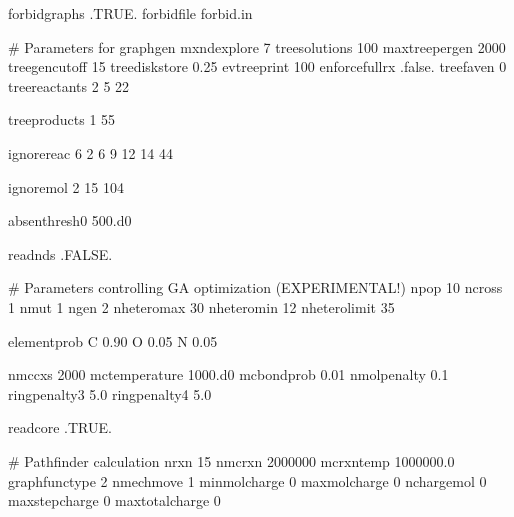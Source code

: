 \begin{DoxyVerb}
 forbidgraphs .TRUE.
 forbidfile forbid.in

 # Parameters for graphgen
 mxndexplore 7
 treesolutions 100
 maxtreepergen 2000
 treegencutoff 15
 treediskstore 0.25
 evtreeprint 100
 enforcefullrx .false.
 treefaven 0
 treereactants 2
 5 22

 treeproducts 1
 55

 ignorereac 6
 2 6 9 12 14 44

 ignoremol 2
 15 104

 absenthresh0 500.d0

 readnds .FALSE.

 # Parameters controlling GA optimization (EXPERIMENTAL!)
 npop 10
 ncross 1
 nmut 1
 ngen 2
 nheteromax 30
 nheteromin 12
 nheterolimit 35

 elementprob{
 C 0.90
 O 0.05
 N 0.05
 }

 nmccxs  2000
 mctemperature 1000.d0
 mcbondprob 0.01
 nmolpenalty 0.1
 ringpenalty3 5.0
 ringpenalty4 5.0

 readcore .TRUE.

 # Pathfinder calculation
 nrxn 15
 nmcrxn 2000000
 mcrxntemp 1000000.0
 graphfunctype 2
 nmechmove 1
 minmolcharge 0
 maxmolcharge 0
 nchargemol 0
 maxstepcharge 0
 maxtotalcharge 0
\end{DoxyVerb}
 